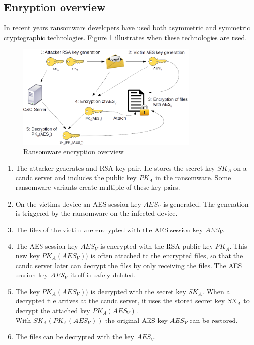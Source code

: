 \pagebreak
\subsection{Enryption overview}
\label{subsec:encryption_overview}

In recent years ransomware developers have used both asymmetric and symmetric cryptographic technologies. Figure \ref{fig:encryption_overview} illustrates when these technologies are used.

\begin{figure}[htbp]
  \begin{center}
    \includegraphics[width=0.8\textwidth]{images/encryption_overview.png}
    \caption{Ransomware encryption overview}
    \label{fig:encryption_overview}
  \end{center}
\end{figure}

\begin{enumerate}
\item The attacker generates and RSA key pair. He stores the secret key $SK_A$ on a \gls{candc} server and includes the public key $PK_A$ in the ransomware. Some ransomware variants create multiple of these key pairs.
\item On the victims device an AES session key $AES_V$ is generated. The generation is triggered by the ransomware on the infected device.
\item The files of the victim are encrypted with the AES session key $AES_V$.
\item The AES session key $AES_V$ is encrypted with the RSA public key $PK_A$. This new key $PK_A(AES_V))$ is often attached to the encrypted files, so that the {candc} server later can decrypt the files by only receiving the files. The AES session key $AES_V$ itself is safely deleted.
\item The key $PK_A(AES_V))$ is decrypted with the secret key $SK_A$. When a decrypted file arrives at the \gls{candc} server, it uses the stored secret key $SK_A$ to decrypt the attached key $PK_A(AES_V)$.\\
With $SK_A(PK_A(AES_V))$ the original AES key $AES_V$ can be restored.
\item The files can be decrypted with the key $AES_V$.
\end{enumerate}
